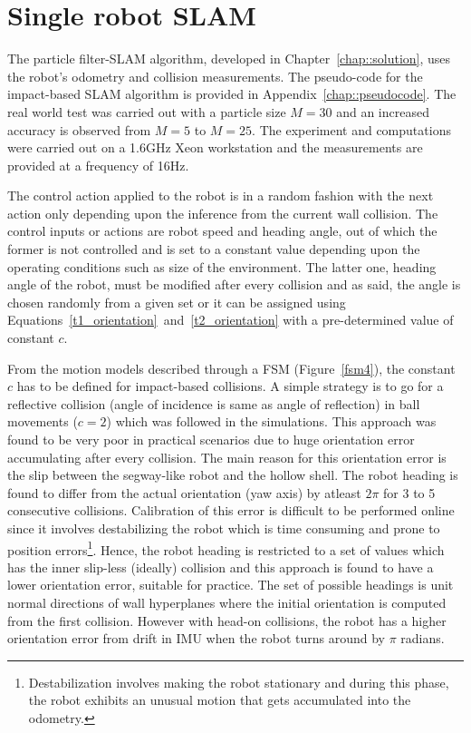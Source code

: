 \section{Single robot SLAM}	\label{sec::single_slam}
The particle filter-SLAM algorithm, developed in Chapter~\ref{chap::solution}, uses the robot's odometry and collision measurements. The pseudo-code for the impact-based SLAM algorithm is provided in Appendix~\ref{chap::pseudocode}. The real world test was carried out with a particle size $M=30$ and an increased accuracy is observed from $M =5$ to $M=25$. The experiment and computations were carried out on a 1.6GHz Xeon workstation and the measurements are provided at a frequency of 16Hz.

The control action applied to the robot is in a random fashion with the next action only depending upon the inference from the current wall collision. The control inputs or actions are robot speed and heading angle, out of which the former is not controlled and is set to a constant value depending upon the operating conditions such as size of the environment. The latter one, heading angle of the robot, must be modified after every collision and as said, the angle is chosen randomly from a given set or it can be assigned using Equations~\ref{t1_orientation}~and~\ref{t2_orientation} with a pre-determined value of constant $c$. 

From the motion models described through a FSM (Figure~\ref{fsm4}), the constant $c$ has to be defined for impact-based collisions. A simple strategy is to go for a reflective collision (angle of incidence is same as angle of reflection) in ball movements ($c=2$) which was followed in the simulations. This approach was found to be very poor in practical scenarios due to huge orientation error accumulating after every collision. The main reason for this orientation error is the slip between the segway-like robot and the hollow shell. The robot heading is found to differ from the actual orientation (yaw axis) by atleast $2\pi$ for 3 to 5 consecutive collisions. Calibration of this error is difficult to be performed online since it involves destabilizing the robot which is time consuming and prone to position errors\footnote{Destabilization involves making the robot stationary and during this phase, the robot exhibits an unusual motion that gets accumulated into the odometry.}. Hence, the robot heading is restricted to a set of values which has the inner slip-less (ideally) collision and this approach is found to have a lower orientation error, suitable for practice. The set of possible headings is unit normal directions of wall hyperplanes where the initial orientation is computed from the first collision. However with head-on collisions, the robot has a higher orientation error from drift in IMU when the robot turns around by $\pi$ radians.        

